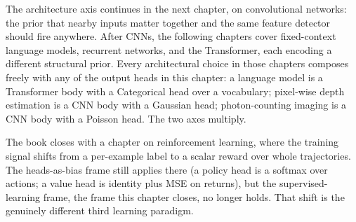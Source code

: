 The architecture axis continues in the next chapter, on convolutional
networks: the prior that nearby inputs matter together and the same
feature detector should fire anywhere. After CNNs, the following
chapters cover fixed-context language models, recurrent networks, and
the Transformer, each encoding a different structural prior. Every
architectural choice in those chapters composes freely with any of the
output heads in this chapter: a language model is a Transformer body
with a Categorical head over a vocabulary; pixel-wise depth estimation
is a CNN body with a Gaussian head; photon-counting imaging is a CNN
body with a Poisson head. The two axes multiply.

The book closes with a chapter on reinforcement learning, where the
training signal shifts from a per-example label to a scalar reward over
whole trajectories. The heads-as-bias frame still applies there (a
policy head is a softmax over actions; a value head is identity plus MSE
on returns), but the supervised-learning frame, the frame this chapter
closes, no longer holds. That shift is the genuinely different third
learning paradigm.
